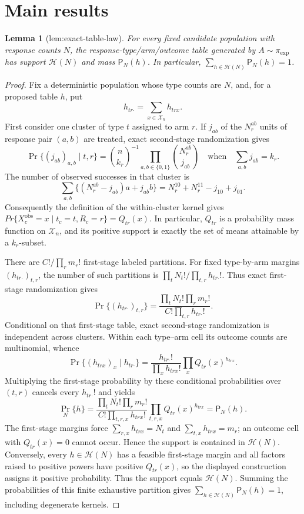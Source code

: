 \documentclass{article}
\newtheorem{lemma}{Lemma}
\begin{document}
\section{Main results}

\begin{lemma}[lem:exact-table-law]\label{lem:exact-table-law}
For every fixed candidate population with response counts \(N\), the response-type/arm/outcome table generated by \(A\sim\pi_{\exp}\) has support \(\mathcal H(N)\) and mass \(\mathsf P_N(h)\). In particular, \(\sum_{h\in\mathcal H(N)}\mathsf P_N(h)=1\).
\end{lemma}
\begin{proof}
Fix a deterministic population whose type counts are \(N\), and, for a proposed table \(h\), put
\[
h_{tr\boldsymbol\cdot}=\sum_{x\in\mathcal X_n}h_{trx}.
\]
First consider one cluster of type \(t\) assigned to arm \(r\).  If \(j_{ab}\) of the \(N_r^{ab}\) units of response pair \((a,b)\) are treated, exact second-stage randomization gives
\[
 \Pr\{(j_{ab})_{a,b}\mid t,r\}
 =\binom{n}{k_r}^{-1}\prod_{a,b\in\{0,1\}}\binom{N_r^{ab}}{j_{ab}}
 \quad\text{when}\quad \sum_{a,b}j_{ab}=k_r.
\]
The number of observed successes in that cluster is
\[
 \sum_{a,b}\{(N_r^{ab}-j_{ab})a+j_{ab}b\}
 =N_r^{10}+N_r^{11}-j_{10}+j_{01}.
\]
Consequently the definition of the within-cluster kernel gives
\(Pr\{X_c^{\mathrm{obs}}=x\mid t_c=t,R_c=r\}=Q_{tr}(x)\).  In particular, \(Q_{tr}\) is a probability mass function on \(\mathcal X_n\), and its positive support is exactly the set of means attainable by a \(k_r\)-subset.

There are \(C!/\prod_r m_r!\) first-stage labeled partitions.  For fixed type-by-arm margins \((h_{tr\boldsymbol\cdot})_{t,r}\), the number of such partitions is \(\prod_t N_t!/\prod_{t,r}h_{tr\boldsymbol\cdot}!\).  Thus exact first-stage randomization gives
\[
 \Pr\{(h_{tr\boldsymbol\cdot})_{t,r}\}
 =\frac{\prod_tN_t!\prod_rm_r!}
 {C!\prod_{t,r}h_{tr\boldsymbol\cdot}!}.
\]
Conditional on that first-stage table, exact second-stage randomization is independent across clusters.  Within each type--arm cell its outcome counts are multinomial, whence
\[
 \Pr\{(h_{trx})_x\mid h_{tr\boldsymbol\cdot}\}
 =\frac{h_{tr\boldsymbol\cdot}!}{\prod_xh_{trx}!}
   \prod_xQ_{tr}(x)^{h_{trx}}.
\]
Multiplying the first-stage probability by these conditional probabilities over \((t,r)\) cancels every \(h_{tr\boldsymbol\cdot}!\) and yields
\[
 \Pr_N\{h\}
 =\frac{\prod_tN_t!\prod_rm_r!}{C!\prod_{t,r,x}h_{trx}!}
   \prod_{t,r,x}Q_{tr}(x)^{h_{trx}}
 =\mathsf P_N(h).
\]
The first-stage margins force \(\sum_{r,x}h_{trx}=N_t\) and \(\sum_{t,x}h_{trx}=m_r\); an outcome cell with \(Q_{tr}(x)=0\) cannot occur.  Hence the support is contained in \(\mathcal H(N)\).  Conversely, every \(h\in\mathcal H(N)\) has a feasible first-stage margin and all factors raised to positive powers have positive \(Q_{tr}(x)\), so the displayed construction assigns it positive probability.  Thus the support equals \(\mathcal H(N)\).  Summing the probabilities of this finite exhaustive partition gives \(\sum_{h\in\mathcal H(N)}\mathsf P_N(h)=1\), including degenerate kernels.
\end{proof}
\end{document}
